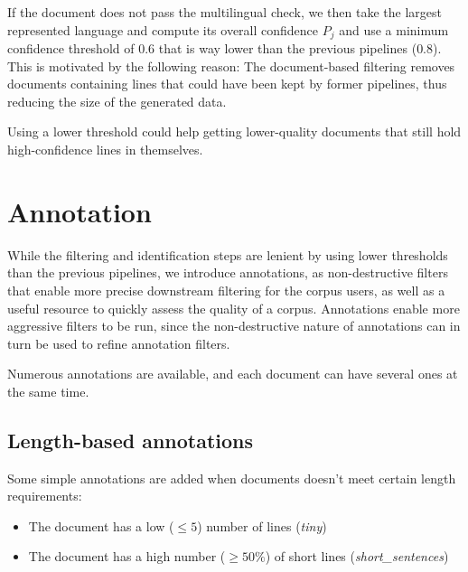 If the document does not pass the multilingual check, we then take the largest represented language and compute its overall confidence $P_j$ and use a minimum confidence threshold of $0.6$ that is way lower than the previous pipelines ($0.8$). This is motivated by the following reason: The document-based filtering removes documents containing lines that could have been kept by former pipelines, thus reducing the size of the generated data.

Using a lower threshold could help getting lower-quality documents that still hold high-confidence lines in themselves.

\section{Annotation}

While the filtering and identification steps are lenient by using lower thresholds than the previous pipelines, we introduce annotations, as non-destructive filters that enable more precise downstream filtering for the corpus users, as well as a useful resource to quickly assess the quality of a corpus. Annotations enable more aggressive filters to be run, since the non-destructive nature of annotations can in turn be used to refine annotation filters.

Numerous annotations are available, and each document can have several ones at the same time.

\subsection{Length-based annotations}

Some simple annotations are added when documents doesn't meet certain length requirements:

\begin{itemize}
    \item The document has a low ($\le 5$) number of lines (\emph{tiny})
    \item The document has a high number ($\ge 50\%$) of short lines (\emph{short\_sentences})
\end{itemize}

